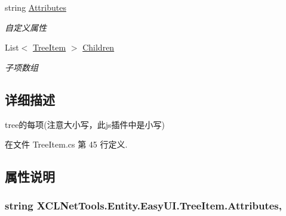 \begin{DoxyCompactItemize}
string \hyperlink{class_x_c_l_net_tools_1_1_entity_1_1_easy_u_i_1_1_tree_item_a8f59dd785ca1acd2b70d5c159b711552}{Attributes}
\begin{DoxyCompactList}\small\item\em 自定义属性 \end{DoxyCompactList}\item 
List$<$ \hyperlink{class_x_c_l_net_tools_1_1_entity_1_1_easy_u_i_1_1_tree_item}{Tree\-Item} $>$ \hyperlink{class_x_c_l_net_tools_1_1_entity_1_1_easy_u_i_1_1_tree_item_a70ed6a7899043a9f8de3f28794ebd720}{Children}
\begin{DoxyCompactList}\small\item\em 子项数组 \end{DoxyCompactList}\end{DoxyCompactItemize}


\subsection{详细描述}
tree的每项(注意大小写，此js插件中是小写) 



在文件 Tree\-Item.\-cs 第 45 行定义.



\subsection{属性说明}
\hypertarget{class_x_c_l_net_tools_1_1_entity_1_1_easy_u_i_1_1_tree_item_a8f59dd785ca1acd2b70d5c159b711552}{
\subsubsection[{Attributes}]{\setlength{\rightskip}{0pt plus 5cm}string X\-C\-L\-Net\-Tools.\-Entity.\-Easy\-U\-I.\-Tree\-Item.\-Attributes\hspace{0.3cm}{\ttfamily [get]}, {\ttfamily [set]}}}\label{class_x_c_l_net_tools_1_1_entity_1_1_easy_u_i_1_1_tree_item_a8f59dd785ca1acd2b70d5c159b711552}


